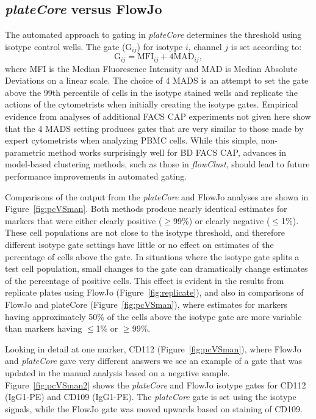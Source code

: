 \documentclass[12pt]{article}
\newcommand{\Rpackage}[1]{{\textit{#1}}}
\begin{document}
\subsection*{\Rpackage{plateCore} versus FlowJo}
The automated approach to gating in \Rpackage{plateCore} determines the
threshold using isotype control wells. The gate (G$_{ij}$) for isotype $i$,
channel $j$ is set according to:
\begin{equation}
\text{G}_{ij} = \text{MFI}_{ij} + 4 \text{MAD}_{ij},
\label{isoGate}
\end{equation}
where MFI is the Median Fluoresence Intensity and MAD is Median Absolute
Deviations on a linear scale. The choice of 4 MADS is an attempt to set the
gate above the 99th percentile of cells in the isotype stained wells and
replicate the actions of the cytometrists when initially creating the isotype
gates. Empirical evidence from analyses of additional FACS CAP experiments not
given here show that the 4 MADS setting produces gates that are very
similar to those made by expert cytometrists when analyzing PBMC cells. While
this simple, non-parametric method works surprisingly well for BD FACS CAP,
advances in model-based clustering methods, such as those in
\Rpackage{flowClust}, should lead to future performance improvements in
automated gating.

Comparisons of the output from the \Rpackage{plateCore} and FlowJo analyses are
shown in Figure~\ref{fig:pcVSman}. Both methods prodcue nearly identical
estimates for markers that were either clearly positive ($\ge$99\%) or clearly
negative ($\le$1\%). These cell populations are not close to the isotype
threshold, and therefore different isotype gate settings have little or no
effect on estimates of the percentage of cells above the gate. In situations
where the isotype gate splits a test cell population, small changes to the gate can
dramatically change estimates of the percentage of positive cells. This effect
is evident in the results from replicate plates using FlowJo
(Figure~\ref{fig:replicate}), and also in comparisons of FlowJo and plateCore
(Figure~\ref{fig:pcVSman}), where estimates for markers having approximately
50\% of the cells above the isotype gate are more variable than markers having
$\le$1\% or $\ge$99\%.

Looking in detail at one marker, CD112 (Figure~\ref{fig:pcVSman}), where FlowJo
and \Rpackage{plateCore} gave very different answers we see an example of a
gate that was updated in the manual analysis based on a negative sample.
Figure~\ref{fig:pcVSman2} shows the \Rpackage{plateCore} and FlowJo isotype
gates for CD112 (IgG1-PE) and CD109 (IgG1-PE). The \Rpackage{plateCore} gate is
set using the isotype signals, while the FlowJo gate was moved upwards based
on staining of CD109. 
\end{document}
